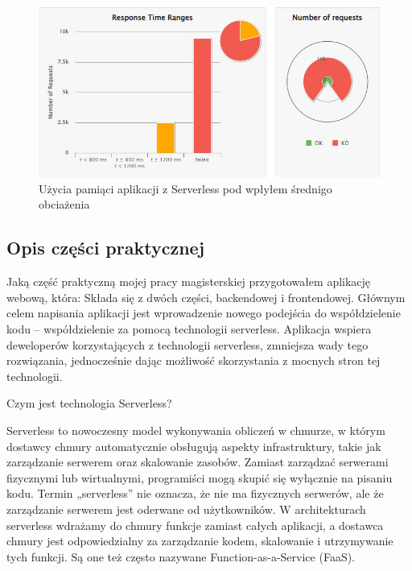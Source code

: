 \documentclass[runningheads,12pt]{llncs}
\begin{document}
\begin{figure}
    \includegraphics[width=\linewidth]{images/serverless-gatling-high-graph.jpg}
    \caption{Użycia pamiąci aplikacji z Serverless pod wpłyłem średnigo obciażenia} \label{fig1}
\end{figure}

\newpage



\subsection{Opis części praktycznej}

Jaką część praktyczną mojej pracy magisterskiej przygotowałem aplikację webową, która:
Składa się z dwóch części, backendowej i frontendowej.
Głównym celem napisania aplikacji jest wprowadzenie nowego podejścia do współdzielenie kodu – współdzielenie za pomocą technologii serverless. Aplikacja wspiera deweloperów korzystających z technologii serverless, zmniejsza wady tego rozwiązania, jednocześnie dając możliwość skorzystania z mocnych stron tej technologii.

Czym jest technologia Serverless?

Serverless to nowoczesny model wykonywania obliczeń w chmurze, w którym dostawcy chmury automatycznie obsługują aspekty infrastruktury, takie jak zarządzanie serwerem oraz skalowanie zasobów. Zamiast zarządzać serwerami fizycznymi lub wirtualnymi, programiści mogą skupić się wyłącznie na pisaniu kodu. Termin „serverless” nie oznacza, że nie ma fizycznych serwerów, ale że zarządzanie serwerem jest oderwane od użytkowników. W architekturach serverless wdrażamy do chmury funkcje zamiast całych aplikacji, a dostawca chmury jest odpowiedzialny za zarządzanie kodem, skalowanie i utrzymywanie tych funkcji. Są one też często nazywane Function-as-a-Service (FaaS).
\end{document}
